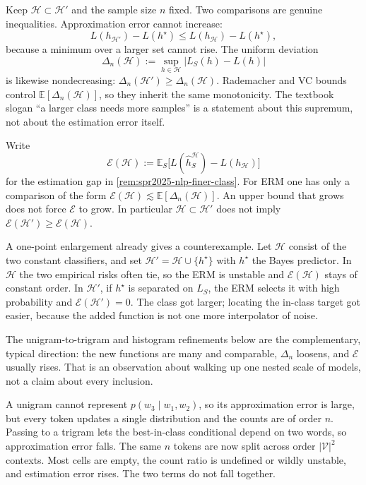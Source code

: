 \documentclass[11pt,a4paper]{article}
\theoremstyle{definition}
\begin{document}
\begin{note}\label{note:spr2025-nlp-est-not-mono}
Keep \(\mathcal{H}\subset\mathcal{H}'\) and the sample size \(n\) fixed. Two comparisons are genuine inequalities. Approximation error cannot increase:
\[
L(h_{\mathcal{H}'})-L(h^\star)
\leq
L(h_{\mathcal{H}})-L(h^\star),
\]
because a minimum over a larger set cannot rise. The uniform deviation
\[
\Delta_n(\mathcal{H})
:=\sup_{h\in\mathcal{H}}\bigl\lvert L_S(h)-L(h)\bigr\rvert
\]
is likewise nondecreasing: \(\Delta_n(\mathcal{H}')\ge\Delta_n(\mathcal{H})\). Rademacher and VC bounds control \(\mathbb{E}[\Delta_n(\mathcal{H})]\), so they inherit the same monotonicity. The textbook slogan ``a larger class needs more samples'' is a statement about this supremum, not about the estimation error itself.

Write
\[
\mathcal{E}(\mathcal{H})
:=\mathbb{E}_S\bigl[L(\widehat h_S^{\mathcal{H}})-L(h_{\mathcal{H}})\bigr]
\]
for the estimation gap in \cref{rem:spr2025-nlp-finer-class}. For ERM one has only a comparison of the form \(\mathcal{E}(\mathcal{H})\lesssim\mathbb{E}[\Delta_n(\mathcal{H})]\). An upper bound that grows does not force \(\mathcal{E}\) to grow. In particular \(\mathcal{H}\subset\mathcal{H}'\) does not imply \(\mathcal{E}(\mathcal{H}')\ge\mathcal{E}(\mathcal{H})\).

A one-point enlargement already gives a counterexample. Let \(\mathcal{H}\) consist of the two constant classifiers, and set \(\mathcal{H}'=\mathcal{H}\cup\{h^\star\}\) with \(h^\star\) the Bayes predictor. In \(\mathcal{H}\) the two empirical risks often tie, so the ERM is unstable and \(\mathcal{E}(\mathcal{H})\) stays of constant order. In \(\mathcal{H}'\), if \(h^\star\) is separated on \(L_S\), the ERM selects it with high probability and \(\mathcal{E}(\mathcal{H}')=0\). The class got larger; locating the in-class target got easier, because the added function is not one more interpolator of noise.

The unigram-to-trigram and histogram refinements below are the complementary, typical direction: the new functions are many and comparable, \(\Delta_n\) loosens, and \(\mathcal{E}\) usually rises. That is an observation about walking up one nested scale of models, not a claim about every inclusion.
\end{note}

\begin{example}
A unigram cannot represent \(p(w_3\mid w_1,w_2)\), so its approximation error is large, but every token updates a single distribution and the counts are of order \(n\). Passing to a trigram lets the best-in-class conditional depend on two words, so approximation error falls. The same \(n\) tokens are now split across order \(|\mathcal{V}|^2\) contexts. Most cells are empty, the count ratio is undefined or wildly unstable, and estimation error rises. The two terms do not fall together.
\end{example}
\end{document}
